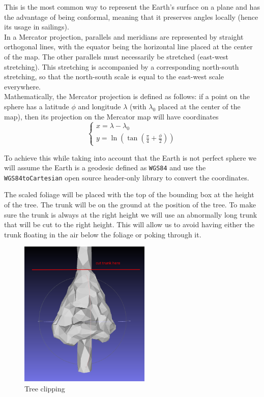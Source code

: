 \documentclass[12pt]{article}
\begin{document}
This is the most common way to represent the Earth's surface on a plane and has
the advantage of being conformal, meaning that it preserves angles locally (hence
 its usage in sailings). \\
 In a Mercator projection, parallels and meridians are represented by straight
 orthogonal lines, with the equator being the horizontal line placed at the center
  of the map. The other parallels must necessarily be stretched (east-west
  stretching). This stretching is accompanied by a corresponding north-south
  stretching, so that the north-south scale is equal to the east-west scale
  everywhere. \\
  Mathematically, the Mercator projection is defined as follows: if a point on
  the sphere has a latitude $\phi$ and longitude $\lambda$ (with $\lambda_{0}$
  placed at the center of the map), then its projection on the Mercator map will
  have coordinates
  \begin{equation}
    \left\{
    \begin{array}{l}
        x =  \lambda - \lambda_{0} \\
        y =  \ln(\tan(\frac{\pi}{4} + \frac{\phi}{2}))
    \end{array}
    \right.
\end{equation}

To achieve this while taking into account that the Earth is not perfect sphere
we will assume the Earth is a geodesic defined as \texttt{WGS84}\cite{wgs84} and use
the \texttt{WGS84toCartesian}\cite{wgs84_to_cartesian} open source header-only
library to convert the coordinates.

The scaled foliage will be placed with the top of the bounding box at the
height of the tree. The trunk will be on the ground at the position of the tree.
To make sure the trunk is always at the right height we will use an abnormally
long trunk that will be cut to the right height. This will allow us to avoid having 
either the trunk floating in the air below the foliage or poking through it.

\begin{figure}[H]
    \centering
    \includegraphics[height=7cm]{images/trunk_cut.png}
    \caption{Tree clipping}
\end{figure}
\end{document}
